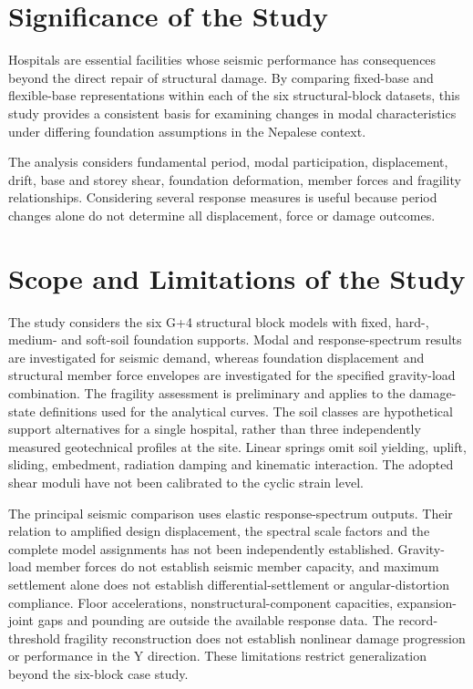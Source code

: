 \section{Significance of the Study}
Hospitals are essential facilities whose seismic performance has consequences beyond the direct repair of structural damage. By comparing fixed-base and flexible-base representations within each of the six structural-block datasets, this study provides a consistent basis for examining changes in modal characteristics under differing foundation assumptions in the Nepalese context.

The analysis considers fundamental period, modal participation, displacement, drift, base and storey shear, foundation deformation, member forces and fragility relationships. Considering several response measures is useful because period changes alone do not determine all displacement, force or damage outcomes.

\section{Scope and Limitations of the Study}
The study considers the six G+4 structural block models with fixed, hard-, medium- and soft-soil foundation supports. Modal and response-spectrum results are investigated for seismic demand, whereas foundation displacement and structural member force envelopes are investigated for the specified gravity-load combination. The fragility assessment is preliminary and applies to the damage-state definitions used for the analytical curves. The soil classes are hypothetical support alternatives for a single hospital, rather than three independently measured geotechnical profiles at the site. Linear springs omit soil yielding, uplift, sliding, embedment, radiation damping and kinematic interaction. The adopted shear moduli have not been calibrated to the cyclic strain level.

The principal seismic comparison uses elastic response-spectrum outputs. Their relation to amplified design displacement, the spectral scale factors and the complete model assignments has not been independently established. Gravity-load member forces do not establish seismic member capacity, and maximum settlement alone does not establish differential-settlement or angular-distortion compliance. Floor accelerations, nonstructural-component capacities, expansion-joint gaps and pounding are outside the available response data. The record-threshold fragility reconstruction does not establish nonlinear damage progression or performance in the Y direction. These limitations restrict generalization beyond the six-block case study.

